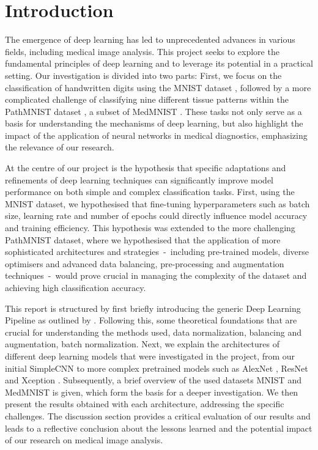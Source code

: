 \section{Introduction}\label{intro}


The emergence of deep learning has led to unprecedented advances in various fields, including medical image analysis. This project seeks to explore the fundamental principles of deep learning and to leverage its potential in a practical setting. Our investigation is divided into two parts: First, we focus on the classification of handwritten digits using the MNIST dataset \citep{mnist}, followed by a more complicated challenge of classifying nine different tissue patterns within the PathMNIST dataset \citep{kather2018, kather2019}, a subset of MedMNIST \citep{medmnistv1}. These tasks not only serve as a basis for understanding the mechanisms of deep learning, but also highlight the impact of the application of neural networks in medical diagnostics, emphasizing the relevance of our research.

At the centre of our project is the hypothesis that specific adaptations and refinements of deep learning techniques can significantly improve model performance on both simple and complex classification tasks. First, using the MNIST dataset, we hypothesised that fine-tuning hyperparameters such as batch size, learning rate and number of epochs could directly influence model accuracy and training efficiency. This hypothesis was extended to the more challenging PathMNIST dataset, where we hypothesised that the application of more sophisticated architectures and strategies~-~including pre-trained models, diverse optimisers and advanced data balancing, pre-processing and augmentation techniques~-~would prove crucial in managing the complexity of the dataset and achieving high classification accuracy.

This report is structured by first briefly introducing the generic Deep Learning Pipeline as outlined by \citep{alzubaidi2021review}. Following this, some theoretical foundations that are crucial for understanding the methods used, data normalization, balancing and augmentation, batch normalization. Next, we explain the architectures of different deep learning models that were investigated in the project, from our initial SimpleCNN to more complex pretrained models such as AlexNet \citep{AlexNetoriginal}, ResNet \citep{he2015deep} and Xception \citep{chollet2017xception}. Subsequently, a brief overview of the used datasets MNIST and MedMNIST is given, which form the basis for a deeper investigation. We then present the results obtained with each architecture, addressing the specific challenges. The discussion section provides a critical evaluation of our results and leads to a reflective conclusion about the lessons learned and the potential impact of our research on medical image analysis.
